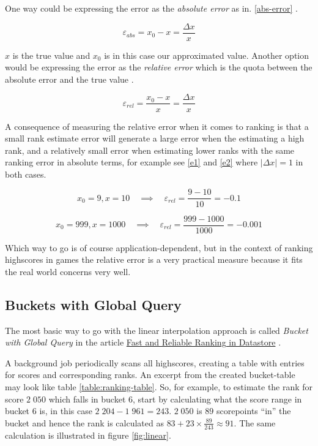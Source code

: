 One way could be expressing the error as the \emph{absolute error} as in. \ref{abs-error} \cite{pohl}.

\begin{equation}
  \label{abs-error}
  \varepsilon_{abs} = x_0 - x = \frac{\Delta x}{x} 
\end{equation}

$x$ is the true value and $x_0$ is in this case our approximated value. Another option would be expressing the error as the \emph{relative error} which is the quota between the absolute error and the true value \cite{pohl}.

\begin{equation}
  \label{rel-error}
  \varepsilon_{rel} = \frac{x_0 - x}{x} = \frac{\Delta x}{x} 
\end{equation}

A consequence of measuring the relative error when it comes to ranking is that a small rank estimate error will generate a large error when the estimating a high rank, and a relatively small error when estimating lower ranks with the same ranking error in absolute terms, for example see \ref{e1} and \ref{e2} where $|\Delta x| = 1$ in both cases.

\begin{equation}
  \label{e1}
x_0 = 9, x = 10 \quad \implies \quad \varepsilon_{rel} = \frac{9 - 10}{10} = -0.1  
\end{equation}

\begin{equation}
  \label{e2}
x_0 = 999, x = 1000 \quad \implies \quad \varepsilon_{rel} = \frac{999 - 1000}{1000} = -0.001  
  \end{equation}

Which way to go is of course application-dependent, but in the context of  ranking highscores in games the relative error is a very practical measure because it fits the real world concerns very well.

\subsection{\label{bucket}Buckets with Global Query}

The most basic way to go with the linear interpolation approach is called \emph{Bucket with Global Query} in the article \href{https://cloud.google.com/datastore/docs/articles/fast-and-reliable-ranking-in-datastore/}{Fast and Reliable Ranking in Datastore} \cite{ranking-in-datastore}. 

A background job periodically scans all highscores, creating a table with entries for scores and corresponding ranks. An excerpt from the created bucket-table may look like table \ref{table:ranking-table}. So, for example, to estimate the rank for score $2\;050$ which falls in bucket 6, start by calculating what the score range in bucket 6 is, in this case $2\;204 - 1\;961 = 243$. $2\;050$ is $89$ scorepoints ``in'' the bucket and hence the rank is calculated as $83 + 23 \times \frac{89}{243} \approx 91$. The same calculation is illustrated in figure \ref{fig:linear}.

